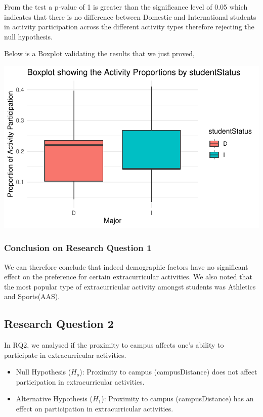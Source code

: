 \documentclass[
  letterpaper,
  DIV=11,
  numbers=noendperiod]{scrartcl}
\providecommand{\tightlist}{%
  \setlength{\itemsep}{0pt}\setlength{\parskip}{0pt}}\usepackage{longtable,booktabs,array}
\begin{document}
From the test a p-value of 1 is greater than the significance level of
0.05 which indicates that there is no difference between Domestic and
International students in activity participation across the different
activity types therefore rejecting the null hypothesis.

Below is a Boxplot validating the results that we just proved,

\includegraphics{technical_report_files/figure-pdf/r14-1.pdf}

\subsubsection{Conclusion on Research Question
1}\label{conclusion-on-research-question-1}

We can therefore conclude that indeed demographic factors have no
significant effect on the preference for certain extracurricular
activities. We also noted that the most popular type of extracurricular
activity amongst students was Athletics and Sports(AAS).

\subsection{Research Question 2}\label{research-question-2}

In RQ2, we analysed if the proximity to campus affects one's ability to
participate in extracurricular activities.

\begin{itemize}
\tightlist
\item
  Null Hypothesis (\(H_{o}\)): Proximity to campus (campusDistance) does
  not affect participation in extracurricular activities.
\item
  Alternative Hypothesis (\(H_{1}\)): Proximity to campus
  (campusDistance) has an effect on participation in extracurricular
  activities.
\end{itemize}
\end{document}
